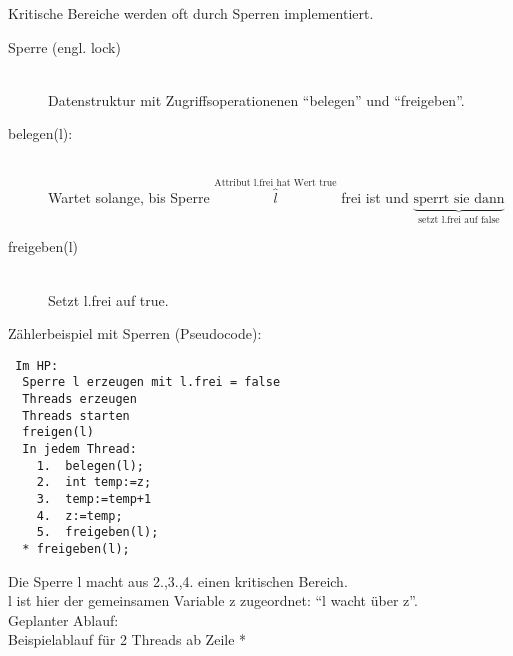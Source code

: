 \documentclass[a4paper,12pt]{scrartcl}
\begin{document}
Kritische Bereiche werden oft durch Sperren implementiert.
\begin{description}
 \item[Sperre (engl. lock)]\quad\\
 Datenstruktur mit Zugriffsoperationenen "`belegen"' und "`freigeben"'.
 \item[belegen(l):]\quad\\
 Wartet solange, bis Sperre $\overbrace{l}^{\text{Attribut l.frei hat Wert true}}$ frei ist und $\underbrace{\text{sperrt sie dann}}_{\text{setzt l.frei auf false}}$
 \item[freigeben(l)]\quad\\
 Setzt l.frei auf true.
\end{description}

Zählerbeispiel mit Sperren (Pseudocode):
\begin{lstlisting}
 Im HP:
  Sperre l erzeugen mit l.frei = false
  Threads erzeugen
  Threads starten
  freigen(l)
  In jedem Thread:
    1.	belegen(l);
    2.	int temp:=z;
    3.	temp:=temp+1
    4.	z:=temp;
    5.	freigeben(l); 
  * freigeben(l);
\end{lstlisting}
Die Sperre l macht aus 2.,3.,4. einen kritischen Bereich.\\
l ist hier der gemeinsamen Variable z zugeordnet: "`l wacht über z"'.\\
Geplanter Ablauf:\\

Beispielablauf für 2 Threads ab Zeile *
\end{document}
